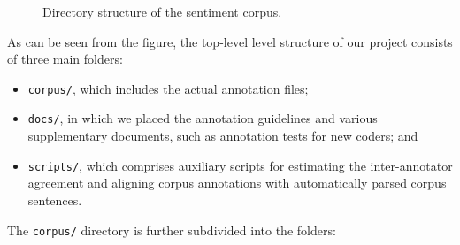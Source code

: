 \begin{figure}[hbt!]
\caption{Directory structure of the sentiment
  corpus.\label{fig:snt:corpus}}
\end{figure}
As can be seen from the figure, the top-level level structure of our
project consists of three main folders:
\begin{itemize}
  \item\texttt{corpus/}, which includes the actual annotation files;

  \item\texttt{docs/}, in which we placed the annotation guidelines
    and various supplementary documents, such as annotation tests for
    new coders; and

  \item\texttt{scripts/}, which comprises auxiliary scripts for
    estimating the inter-annotator agreement and aligning corpus
    annotations with automatically parsed corpus sentences.
\end{itemize}
The \texttt{corpus/} directory is further subdivided into the folders:
